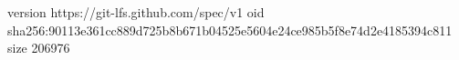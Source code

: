 version https://git-lfs.github.com/spec/v1
oid sha256:90113e361cc889d725b8b671b04525e5604e24ce985b5f8e74d2e4185394c811
size 206976
